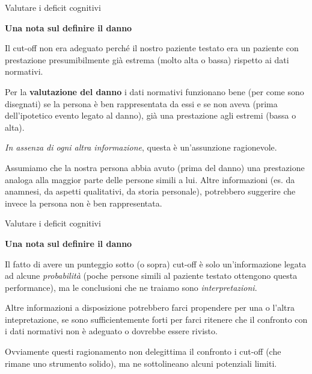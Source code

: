 \documentclass[
  ignorenonframetext,
]{beamer}
\begin{document}
\begin{frame}{Valutare i deficit cognitivi}
\label{valutare-i-deficit-cognitivi-33}
\begin{center}
  \textbf{Una nota sul definire il danno}
\end{center}

\small

Il cut-off non era adeguato perché il nostro paziente testato era un
paziente con prestazione presumibilmente già estrema (molto alta o
bassa) rispetto ai dati normativi.

Per la \textbf{valutazione del danno} i dati normativi funzionano bene
(per come sono disegnati) se la persona è ben rappresentata da essi e se
non aveva (prima dell'ipotetico evento legato al danno), già una
prestazione agli estremi (bassa o alta).

\emph{In assenza di ogni altra informazione}, questa è un'assunzione
ragionevole.

Assumiamo che la nostra persona abbia avuto (prima del danno) una
prestazione analoga alla maggior parte delle persone simili a lui. Altre
informazioni (es. da anamnesi, da aspetti qualitativi, da storia
personale), potrebbero suggerire che invece la persona non è ben
rappresentata.
\end{frame}

\begin{frame}{Valutare i deficit cognitivi}
\label{valutare-i-deficit-cognitivi-34}
\begin{center}
  \textbf{Una nota sul definire il danno}
\end{center}

Il fatto di avere un punteggio sotto (o sopra) cut-off è solo
un'informazione legata ad alcune \emph{probabilità} (poche persone
simili al paziente testato ottengono questa performance), ma le
conclusioni che ne traiamo sono \emph{interpretazioni}.

Altre informazioni a disposizione potrebbero farci propendere per una o
l'altra intepretazione, se sono sufficientemente forti per farci
ritenere che il confronto con i dati normativi non è adeguato o dovrebbe
essere rivisto.

Ovviamente questi ragionamento non delegittima il confronto i cut-off
(che rimane uno strumento solido), ma ne sottolineano alcuni potenziali
limiti.
\end{frame}
\end{document}

